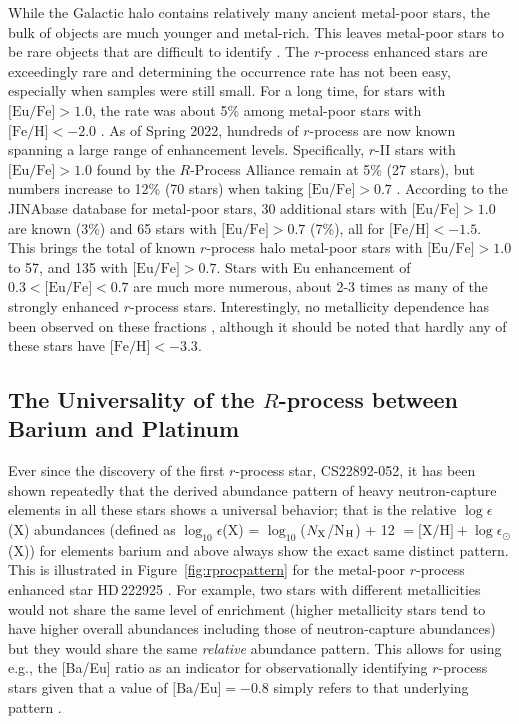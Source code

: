 \documentclass[letterpaper]{article}
\begin{document}
While the Galactic halo contains relatively many ancient metal-poor stars, the bulk of objects are much younger and metal-rich. This leaves metal-poor stars to be rare objects that are difficult to identify \citep{Beers05, Frebel2015}. 
The $r$-process enhanced stars are exceedingly rare and determining the occurrence rate has not been easy, especially when samples were still small. For a long time, for stars with $\mbox{[Eu/Fe]}>1.0$, the rate was about 5\% among metal-poor stars with $\mbox{[Fe/H]}<-2.0$ \citep{Barklem2005}. As of Spring 2022, hundreds of $r$-process are now known spanning a large range of enhancement levels. Specifically, $r$-II stars with $\mbox{[Eu/Fe]}>1.0$ found by the $R$-Process Alliance remain at 5\% (27 stars), but numbers increase to 12\% (70 stars) when taking $\mbox{[Eu/Fe]}>0.7$ \citep{Hansen2018,sakari18,ezzeddine20,holmbeck20}. According to the JINAbase database  \citep{Abohalima18} for metal-poor stars, 30 additional stars with $\mbox{[Eu/Fe]}>1.0$ are known (3\%) and 65 stars with $\mbox{[Eu/Fe]}>0.7$ (7\%), all for $\mbox{[Fe/H]}<-1.5$. This brings the total of known $r$-process halo metal-poor stars with  $\mbox{[Eu/Fe]}>1.0$ to 57, and 135 with $\mbox{[Eu/Fe]}>0.7$. Stars with Eu enhancement of $0.3<\mbox{[Eu/Fe]}<0.7$ are much more numerous, about 2-3 times as many of the strongly enhanced $r$-process stars. Interestingly, no metallicity dependence has been observed on these fractions \citep{holmbeck20}, although it should be noted that hardly any of these stars have $\mbox{[Fe/H]}<-3.3$.



\subsection{The Universality of the $R$-process between Barium and Platinum}

Ever since the discovery of the first $r$-process star, CS22892-052, it has been shown repeatedly that the derived abundance pattern of heavy neutron-capture elements in all these stars shows a universal behavior; that is the relative $\log \epsilon$(X) abundances (defined as $\log_{10}\epsilon$(X) = $\log_{10}$($N_{\rm X}$/N$_{\rm H}$) + 12 $= \mbox{[X/H]} + \log\epsilon_\odot$(X)) for elements barium and above always show the exact same distinct pattern. This is illustrated in Figure~\ref{fig:rprocpattern} for the metal-poor $r$-process enhanced star HD\,222925 \citep{Roederer2022}. For example, two stars with different metallicities would not share the same level of enrichment (higher metallicity stars tend to have higher overall abundances including those of neutron-capture abundances) but they would share the same \textit{relative} abundance pattern. This allows for using e.g., the [Ba/Eu] ratio as an indicator for observationally identifying $r$-process stars given that a value of $\mbox{[Ba/Eu]} =-0.8$ simply refers to that underlying pattern \citep{Sneden2008}.
\end{document}
